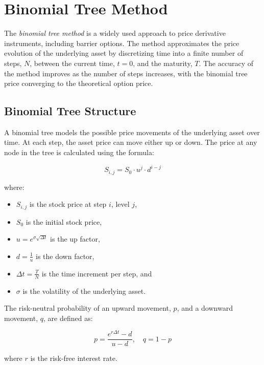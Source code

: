 \chapter{Binomial Tree Method}
\label{sec:binomial-tree}

The \textit{binomial tree method} is a widely used approach to price derivative instruments, including barrier options. The method approximates the price evolution of the underlying asset by discretizing time into a finite number of steps, \(N\), between the current time, \(t = 0\), and the maturity, \(T\). The accuracy of the method improves as the number of steps increases, with the binomial tree price converging to the theoretical option price.

\section{Binomial Tree Structure}

A binomial tree models the possible price movements of the underlying asset over time. At each step, the asset price can move either up or down. The price at any node in the tree is calculated using the formula:

\begin{equation}
S_{i,j} = S_0 \cdot u^j \cdot d^{i-j}
\end{equation}

where:
\begin{itemize}
    \item \(S_{i,j}\) is the stock price at step \(i\), level \(j\),
    \item \(S_0\) is the initial stock price,
    \item \(u = e^{\sigma \sqrt{\Delta t}}\) is the up factor,
    \item \(d = \frac{1}{u}\) is the down factor,
    \item \(\Delta t = \frac{T}{N}\) is the time increment per step, and
    \item \(\sigma\) is the volatility of the underlying asset.
\end{itemize}

The risk-neutral probability of an upward movement, \(p\), and a downward movement, \(q\), are defined as:

\begin{equation}
p = \frac{e^{r \Delta t} - d}{u - d}, \quad q = 1 - p
\end{equation}

where \(r\) is the risk-free interest rate.

